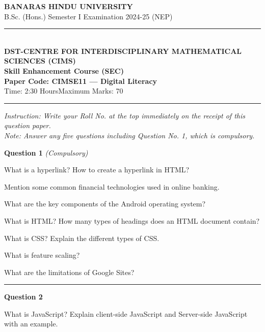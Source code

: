 \documentclass[11pt,a4paper]{article}
\begin{document}
\begin{center}
  {\large\bfseries BANARAS HINDU UNIVERSITY}\\[2pt]
  {\normalsize B.Sc. (Hons.) Semester I Examination 2024-25 (NEP)}\\[6pt]
  \rule{0.8\linewidth}{0.5pt}\\[6pt]
  {\large\bfseries DST-CENTRE FOR INTERDISCIPLINARY MATHEMATICAL SCIENCES (CIMS)}\\[4pt]
  {\large\bfseries Skill Enhancement Course (SEC)}\\[4pt]
  {\large\bfseries Paper Code: CIMSE11 --- Digital Literacy}\\[4pt]
  {\normalsize Time: 2:30 Hours\hfill Maximum Marks: 70}
\end{center}

\rule{\linewidth}{0.4pt}\smallskip



\noindent   \textit{Instruction: Write your Roll No. at the top immediately on the receipt of this question paper.}\\[2pt]



\noindent   \textit{Note: Answer any five questions including Question No. 1, which is compulsory.}
\bigskip




\noindent   \textbf{Question 1}   \textit{(Compulsory)}

\begin{parts}
  \item What is a hyperlink? How to create a hyperlink in HTML?
  \item Mention some common financial technologies used in online banking.
  \item What are the key components of the Android operating system?
  \item What is HTML? How many types of headings does an HTML document contain?
  \item What is CSS? Explain the different types of CSS.
  \item What is feature scaling?
  \item What are the limitations of Google Sites?
\end{parts}

\medskip\rule{\linewidth}{0.2pt}\medskip




\noindent   \textbf{Question 2}

What is JavaScript? Explain client-side JavaScript and Server-side JavaScript with an example.
\end{document}
